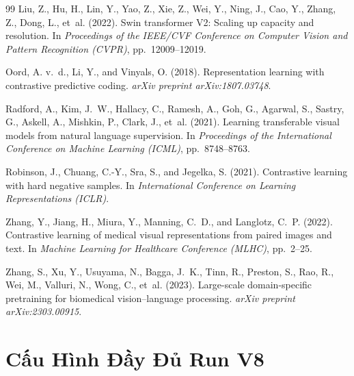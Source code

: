 \documentclass[12pt, a4paper]{article}
\begin{document}
\begin{thebibliography}{99}
Liu, Z., Hu, H., Lin, Y., Yao, Z., Xie, Z., Wei, Y., Ning, J., Cao, Y., Zhang,
  Z., Dong, L., et~al. (2022).
\newblock Swin transformer {V2}: Scaling up capacity and resolution.
\newblock In \textit{Proceedings of the IEEE/CVF Conference on Computer Vision
  and Pattern Recognition (CVPR)}, pp.~12009--12019.

Oord, A. v.~d., Li, Y., and Vinyals, O. (2018).
\newblock Representation learning with contrastive predictive coding.
\newblock \textit{arXiv preprint arXiv:1807.03748}.

Radford, A., Kim, J.~W., Hallacy, C., Ramesh, A., Goh, G., Agarwal, S.,
  Sastry, G., Askell, A., Mishkin, P., Clark, J., et~al. (2021).
\newblock Learning transferable visual models from natural language supervision.
\newblock In \textit{Proceedings of the International Conference on Machine
  Learning (ICML)}, pp.~8748--8763.

Robinson, J., Chuang, C.-Y., Sra, S., and Jegelka, S. (2021).
\newblock Contrastive learning with hard negative samples.
\newblock In \textit{International Conference on Learning Representations
  (ICLR)}.

Zhang, Y., Jiang, H., Miura, Y., Manning, C.~D., and Langlotz, C.~P. (2022).
\newblock Contrastive learning of medical visual representations from paired
  images and text.
\newblock In \textit{Machine Learning for Healthcare Conference (MLHC)},
  pp.~2--25.

Zhang, S., Xu, Y., Usuyama, N., Bagga, J.~K., Tinn, R., Preston, S.,
  Rao, R., Wei, M., Valluri, N., Wong, C., et~al. (2023).
\newblock Large-scale domain-specific pretraining for biomedical
  vision--language processing.
\newblock \textit{arXiv preprint arXiv:2303.00915}.

\end{thebibliography}

\appendix

\section{Cấu Hình Đầy Đủ Run V8}
\label{app:config}
\end{document}
